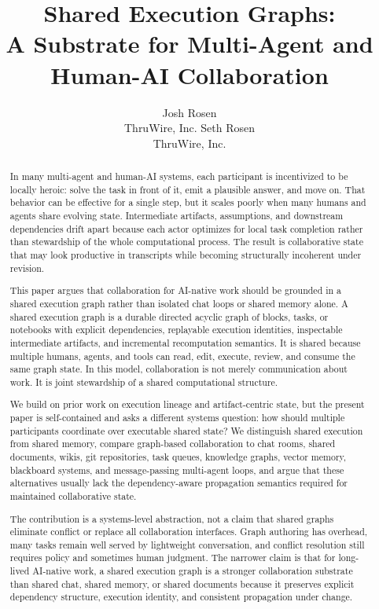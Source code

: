 \documentclass{article}
\title{Shared Execution Graphs:\\
A Substrate for Multi-Agent and Human-AI Collaboration}
\author{
  Josh Rosen \\
  ThruWire, Inc.
  \And
  Seth Rosen \\
  ThruWire, Inc.
}
\begin{document}
\maketitle

\begin{abstract}
In many multi-agent and human-AI systems, each participant is incentivized to be locally heroic: solve the task in front of it, emit a plausible answer, and move on. That behavior can be effective for a single step, but it scales poorly when many humans and agents share evolving state. Intermediate artifacts, assumptions, and downstream dependencies drift apart because each actor optimizes for local task completion rather than stewardship of the whole computational process. The result is collaborative state that may look productive in transcripts while becoming structurally incoherent under revision.

This paper argues that collaboration for AI-native work should be grounded in a shared execution graph rather than isolated chat loops or shared memory alone. A shared execution graph is a durable directed acyclic graph of blocks, tasks, or notebooks with explicit dependencies, replayable execution identities, inspectable intermediate artifacts, and incremental recomputation semantics. It is shared because multiple humans, agents, and tools can read, edit, execute, review, and consume the same graph state. In this model, collaboration is not merely communication about work. It is joint stewardship of a shared computational structure.

We build on prior work on execution lineage and artifact-centric state, but the present paper is self-contained and asks a different systems question: how should multiple participants coordinate over executable shared state? We distinguish shared execution from shared memory, compare graph-based collaboration to chat rooms, shared documents, wikis, git repositories, task queues, knowledge graphs, vector memory, blackboard systems, and message-passing multi-agent loops, and argue that these alternatives usually lack the dependency-aware propagation semantics required for maintained collaborative state.

The contribution is a systems-level abstraction, not a claim that shared graphs eliminate conflict or replace all collaboration interfaces. Graph authoring has overhead, many tasks remain well served by lightweight conversation, and conflict resolution still requires policy and sometimes human judgment. The narrower claim is that for long-lived AI-native work, a shared execution graph is a stronger collaboration substrate than shared chat, shared memory, or shared documents because it preserves explicit dependency structure, execution identity, and consistent propagation under change.
\end{abstract}
\end{document}
